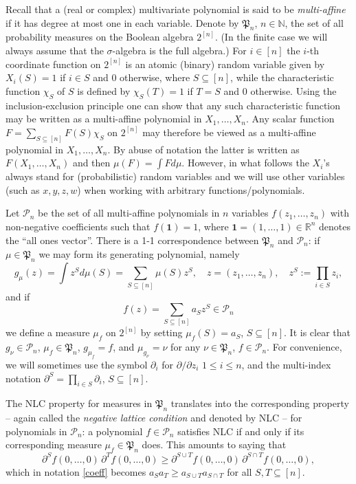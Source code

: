 \documentclass[10pt,reqno]{amsart}
\theoremstyle{plain}
\theoremstyle{definition}
\theoremstyle{remark}
\newcommand{\NN}{\mathbb{N}}
\newcommand{\PP}{\mathcal{P}}
\newcommand{\RR}{\mathbb{R}}
\newcommand{\ben}{\mathbf{1}}
\newcommand{\fP}{\mathfrak{P}}
\newcommand{\pa}{\partial}
\begin{document}
Recall that a (real or complex) multivariate polynomial is said to be 
{\em multi-affine} 
if it has degree at most one in each variable. 
Denote by $\fP_n$, $n\in\NN$, the set of all 
probability measures on the Boolean algebra
$2^{[n]}$. (In the finite case we will always assume that the 
$\sigma$-algebra is the full algebra.) For $i\in [n]$ the $i$-th coordinate 
function on $2^{[n]}$ 
is an atomic (binary) random variable given by $X_i(S)=1$ if 
$i\in S$ and $0$ otherwise, where $S\subseteq [n]$, while the 
characteristic function $\chi_S$ of $S$ is defined by $\chi_S(T)=1$ if 
$T= S$ and $0$ otherwise.
Using the inclusion-exclusion principle one can show that any such 
characteristic function may be written as a multi-affine polynomial in 
$X_1,\ldots,X_n$. Any scalar function 
$F=\sum_{S\subseteq [n]}F(S)\chi_S$ on $2^{[n]}$ may therefore 
be viewed as a multi-affine polynomial in 
$X_1,\ldots,X_n$. By abuse of notation the latter is written as 
$F(X_1,\ldots,X_n)$ and then $\mu(F)=\int Fd\mu$. However, in what follows
the $X_i$'s always stand for (probabilistic) random variables and we will 
use other variables (such as $x,y,z,w$) when working with arbitrary 
functions/polynomials.

Let $\PP_n$ be the set of all multi-affine polynomials
in $n$ variables $f(z_1,\ldots,z_n)$ with non-negative coefficients such that
$f(\ben)=1$, where $\ben=(1,\ldots,1)\in\RR^n$ denotes the 
``all ones vector''. There is a 1-1 
correspondence between $\fP_n$ and $\PP_n$:
if $\mu\in\fP_n$ we may form its generating polynomial, namely 
$$
g_\mu(z) = \int z^{S} d\mu(S) = \sum_{S \subseteq [n]} \mu(S) z^S, \quad
z=(z_1,\ldots, z_n), \quad z^S:= \prod_{i \in S}z_i,
$$
and if 
\begin{equation}\label{coeff}
f(z)=\sum_{S\subseteq [n]}a_Sz^S\in\PP_n
\end{equation}
we define a measure $\mu_f$ on $2^{[n]}$ by setting $\mu_f(S)=a_S$, 
$S\subseteq [n]$. It is clear that $g_\nu\in\PP_n$, $\mu_f\in\fP_n$, 
$g_{\mu_f}=f$, and $\mu_{g_\nu}=\nu$ for any $\nu\in\fP_n$, $f\in\PP_n$. 
For convenience, we will sometimes use the symbol $\pa_i$ for $\pa/\pa z_i$
$1\le i\le n$, and the multi-index notation 
$\pa^S=\prod_{i\in S}\pa_i$, $S\subseteq [n]$. 

The NLC property for measures in $\fP_n$ 
translates into the corresponding property -- again called the 
{\em negative lattice condition} and denoted by NLC -- for polynomials in 
$\PP_n$: a polynomial $f\in\PP_n$ satisfies NLC if and only if its 
corresponding measure $\mu_f\in\fP_n$ does. This amounts to saying that
\begin{equation*}
\pa^S f(0,\ldots,0)\,\pa^T f(0,\ldots,0)\ge \pa^{S\cup T} 
f(0,\ldots,0)\,\pa^{S\cap T} f(0,\ldots,0), \tag*{(NLC)}
\end{equation*}
which in notation \eqref{coeff} becomes  
$a_Sa_T\ge a_{S\cup T}a_{S\cap T}$ for all $S,T\subseteq [n]$.
\end{document}
